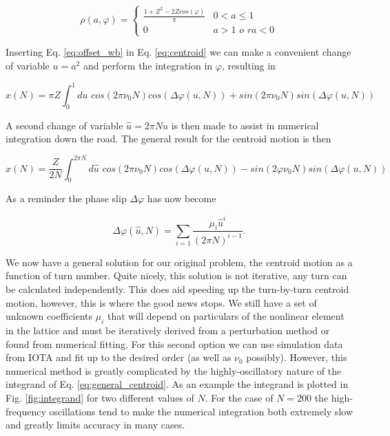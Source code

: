\documentclass[]{article}
\begin{document}
\begin{equation} \label{eq:offset_wb}
\rho(a, \varphi) =
\left\{
\begin{array}{lr}
\frac{1 + Z^2 - 2Zcos(\varphi)}{\pi} &  0 < a \leq 1 \\
0 &  a > 1 \, \,o \, \,r a < 0
\end{array}
\right.
\end{equation}

Inserting Eq. \ref{eq:offset_wb} in Eq. \ref{eq:centroid} we can make a convenient change 
of variable $u=a^2$ and perform the integration in $\varphi$, resulting in

\begin{equation}
	\hat{x}(N) = \pi Z \int_{0}^{1} du \,\, cos(2 \pi \nu_0 N)cos(\Delta \varphi(u, N)) + sin(2 
	\pi 
	\nu_0 N) sin(\Delta \varphi(u, N))
\end{equation}

A second change of variable $\hat{u} = 2 \pi N u$ is then made to assist in numerical 
integration down the road. The general result for the centroid motion is then

\begin{equation} \label{eq:general_centroid}
\hat{x}(N) = \frac{Z}{2 N} \int_{0}^{2\pi N} d\hat{u} \,\, cos(2 \pi \nu_0 N)cos(\Delta 
\varphi(u, 
N)) - 
sin(2 \varphi 
\nu_0 N) sin(\Delta \varphi(u, N))
\end{equation}

As a reminder the phase slip $\Delta \varphi$ has now become

\begin{equation} \label{eq:phase_slip_2} 
	\Delta \varphi(\hat{u}, N) = \sum_{i=1} \frac{\mu_i \hat{u}^{i}}{(2 \pi N)^{i - 1}}.
\end{equation}

We now have a general solution for our original problem, the centroid motion as a 
function of turn number. Quite nicely, this solution is not iterative, any turn can be 
calculated independently. This does aid speeding up the turn-by-turn centroid motion, 
however, this is where the good news stops. We still have a set of unknown coefficients 
$\mu_i$ that will depend on particulars of the nonlinear element in the lattice and must be 
iteratively derived from a perturbation method or found from numerical fitting. For this 
second option we can use simulation data from IOTA and fit up to the desired order (as 
well as $\nu_0$ possibly). However, this numerical method is greatly complicated by the 
highly-oscillatory nature of the integrand of Eq. \ref{eq:general_centroid}. As an example 
the integrand is plotted in Fig. \ref{fig:integrand} for two different values of $N$. For the 
case of $N=200$ the high-frequency oscillations tend to make the numerical integration 
both extremely slow and greatly limits accuracy in many cases.
\end{document}

